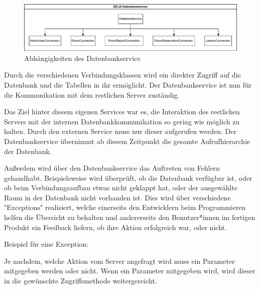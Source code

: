 
\begin{figure}[H]
    \centering
    \includegraphics[width=\textwidth]{media/Sequelize/DatabaseService.svg.pdf}
    \caption{Abhängigkeiten des Datenbankservice}
\end{figure}

Durch die verschiedenen Verbindungsklassen wird ein direkter Zugriff auf die Datenbank und die Tabellen in ihr ermöglicht. Der Datenbankservice ist nun für die Kommunikation mit dem restlichen Server zuständig. 

Das Ziel hinter diesem eigenen Services war es, die Interaktion des restlichen Servers mit der internen Datenbankkommunikation so gering wie möglich zu halten. Durch den externen Service muss nur dieser aufgerufen werden. Der Datenbankservice übernimmt ab diesem Zeitpunkt die gesamte Aufrufhierarchie der Datenbank.

Außerdem wird über den Datenbankservice das Auftreten von Fehlern gehandhabt. Beispielsweise wird überprüft, ob die Datenbank verfügbar ist, oder ob beim Verbindungsaufbau etwas nicht geklappt hat, oder der ausgewählte Raum in der Datenbank nicht vorhanden ist. Dies wird über verschiedene "Exceptions" realisiert, welche einerseits den Entwicklern beim Programmieren helfen die Übersicht zu behalten und andererseits den Benutzer*innen im fertigen Produkt ein Feedback liefern, ob ihre Aktion erfolgreich war, oder nicht.

Beispiel für eine Exception:


Je nachdem, welche Aktion vom Server angefragt wird muss ein Parameter mitgegeben werden oder nicht. Wenn ein Parameter mitgegeben wird, wird dieser in die gewünschte Zugriffsmethode weitergereicht.


